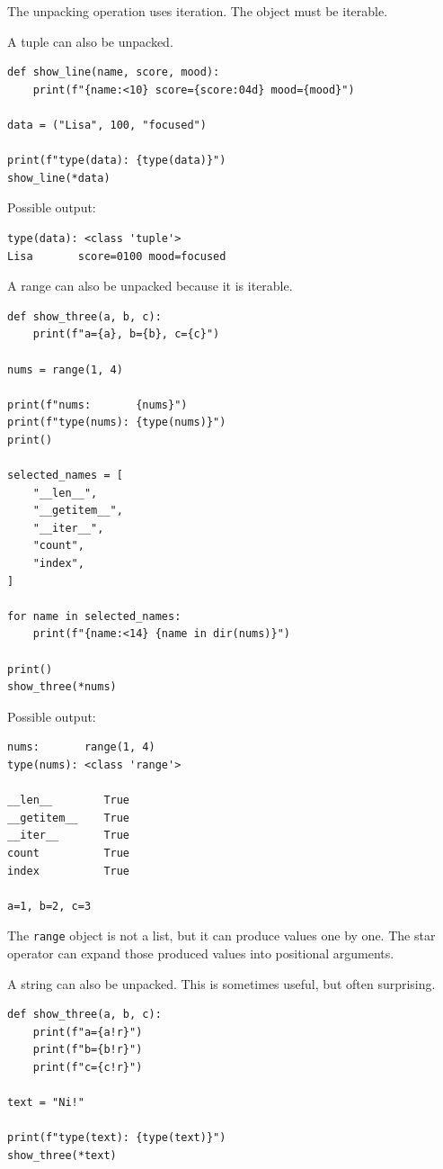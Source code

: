 The unpacking operation uses iteration. The object must be iterable.

A tuple can also be unpacked.

\begin{verbatim}
def show_line(name, score, mood):
    print(f"{name:<10} score={score:04d} mood={mood}")

data = ("Lisa", 100, "focused")

print(f"type(data): {type(data)}")
show_line(*data)
\end{verbatim}

Possible output:

\begin{verbatim}
type(data): <class 'tuple'>
Lisa       score=0100 mood=focused
\end{verbatim}

A range can also be unpacked because it is iterable.

\begin{verbatim}
def show_three(a, b, c):
    print(f"a={a}, b={b}, c={c}")

nums = range(1, 4)

print(f"nums:       {nums}")
print(f"type(nums): {type(nums)}")
print()

selected_names = [
    "__len__",
    "__getitem__",
    "__iter__",
    "count",
    "index",
]

for name in selected_names:
    print(f"{name:<14} {name in dir(nums)}")

print()
show_three(*nums)
\end{verbatim}

Possible output:

\begin{verbatim}
nums:       range(1, 4)
type(nums): <class 'range'>

__len__        True
__getitem__    True
__iter__       True
count          True
index          True

a=1, b=2, c=3
\end{verbatim}

The \texttt{range} object is not a list, but it can produce values one by one. The star operator can expand those produced values into positional arguments.

A string can also be unpacked. This is sometimes useful, but often surprising.

\begin{verbatim}
def show_three(a, b, c):
    print(f"a={a!r}")
    print(f"b={b!r}")
    print(f"c={c!r}")

text = "Ni!"

print(f"type(text): {type(text)}")
show_three(*text)
\end{verbatim}


